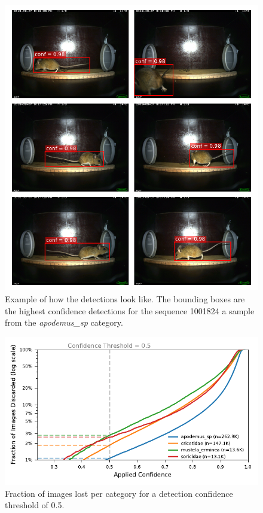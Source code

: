         \begin{figure}[ht]
        \centering
        \includegraphics{figures/detections_on_a_sequence.pdf}
        \caption{Example of how the detections look like. The bounding boxes are the highest confidence detections for the sequence 1001824 a sample from the \textit{apodemus\_sp} category.}
        \label{fig:detection_example}
        \end{figure}

        \begin{figure}[ht]
        \centering
        \includegraphics{figures/discarded_img_by_conf.pdf}
        \caption{Fraction of images lost per category for a detection confidence threshold of 0.5.}
        \label{fig:lost_images}
        \end{figure}

